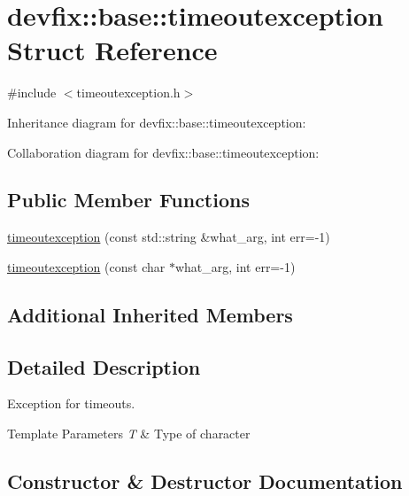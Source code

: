 \hypertarget{structdevfix_1_1base_1_1timeoutexception}{}\section{devfix\+:\+:base\+:\+:timeoutexception Struct Reference}
\label{structdevfix_1_1base_1_1timeoutexception}


{\ttfamily \#include $<$timeoutexception.\+h$>$}



Inheritance diagram for devfix\+:\+:base\+:\+:timeoutexception\+:


Collaboration diagram for devfix\+:\+:base\+:\+:timeoutexception\+:
\subsection*{Public Member Functions}
\begin{DoxyCompactItemize}
\item 
\hyperlink{structdevfix_1_1base_1_1timeoutexception_ad900adf164c04e3a33dafd38ded1f024}{timeoutexception} (const std\+::string \&what\+\_\+arg, int err=-\/1)
\item 
\hyperlink{structdevfix_1_1base_1_1timeoutexception_a684cb2e6e0d78b98d30c505a6bf9066d}{timeoutexception} (const char $\ast$what\+\_\+arg, int err=-\/1)
\end{DoxyCompactItemize}
\subsection*{Additional Inherited Members}


\subsection{Detailed Description}
Exception for timeouts. 
\begin{DoxyTemplParams}{Template Parameters}
{\em T} & Type of character \\
\hline
\end{DoxyTemplParams}


\subsection{Constructor \& Destructor Documentation}
\mbox{\label{structdevfix_1_1base_1_1timeoutexception_ad900adf164c04e3a33dafd38ded1f024}} 
